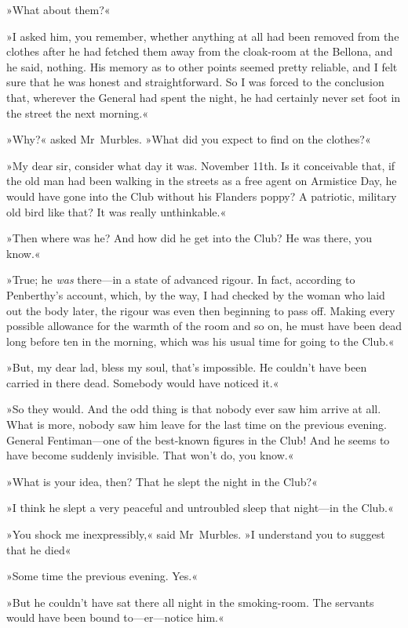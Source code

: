 »What about them?«

»I asked him, you remember, whether anything at all had been removed from the clothes after he had fetched them away from the cloak-room at the Bellona, and he said, nothing. His memory as to other points seemed pretty reliable, and I felt sure that he was honest and straightforward. So I was forced to the conclusion that, wherever the General had spent the night, he had certainly never set foot in the street the next morning.«

»Why?« asked Mr~Murbles. »What did you expect to find on the clothes?«

»My dear sir, consider what day it was. November 11th. Is it conceivable that, if the old man had been walking in the streets as a free agent on Armistice Day, he would have gone into the Club without his Flanders poppy? A patriotic, military old bird like that? It was really unthinkable.«

»Then where was he? And how did he get into the Club? He was there, you know.«

»True; he \textit{was} there—in a state of advanced rigour. In fact, according to Penberthy's account, which, by the way, I had checked by the woman who laid out the body later, the rigour was even then beginning to pass off. Making every possible allowance for the warmth of the room and so on, he must have been dead long before ten in the morning, which was his usual time for going to the Club.«

»But, my dear lad, bless my soul, that's impossible. He couldn't have been carried in there dead. Somebody would have noticed it.«

»So they would. And the odd thing is that nobody ever saw him arrive at all. What is more, nobody saw him leave for the last time on the previous evening. General Fentiman—one of the best-known figures in the Club! And he seems to have become suddenly invisible. That won't do, you know.«

»What is your idea, then? That he slept the night in the Club?«

»I think he slept a very peaceful and untroubled sleep that night—in the Club.«

»You shock me inexpressibly,« said Mr~Murbles. »I understand you to suggest that he died\longdash«

»Some time the previous evening. Yes.«

»But he couldn't have sat there all night in the smoking-room. The servants would have been bound to—er—notice him.«

